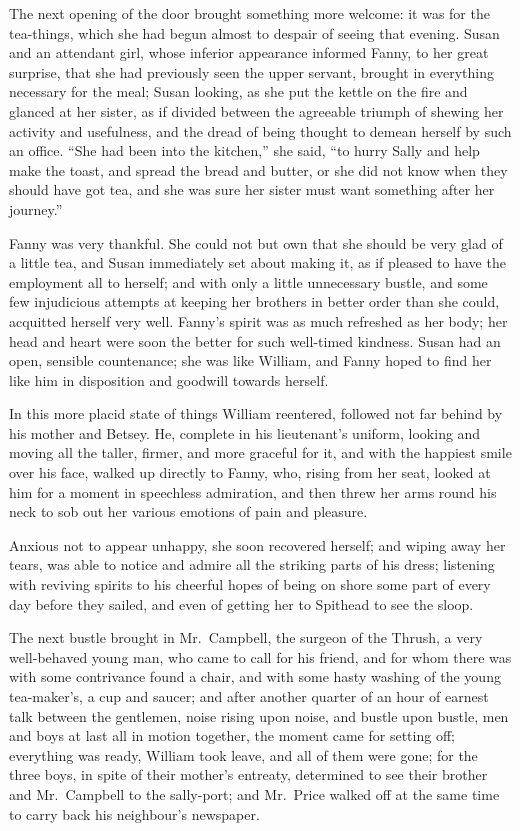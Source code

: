 The next opening of the door brought something more welcome:
it was for the tea-things, which she had begun almost
to despair of seeing that evening.  Susan and an
attendant girl, whose inferior appearance informed Fanny,
to her great surprise, that she had previously seen the
upper servant, brought in everything necessary for the meal;
Susan looking, as she put the kettle on the fire and glanced
at her sister, as if divided between the agreeable triumph
of shewing her activity and usefulness, and the dread
of being thought to demean herself by such an office.
``She had been into the kitchen,'' she said, ``to hurry Sally
and help make the toast, and spread the bread and butter,
or she did not know when they should have got tea,
and she was sure her sister must want something after
her journey.''

Fanny was very thankful.  She could not but own that she
should be very glad of a little tea, and Susan immediately
set about making it, as if pleased to have the employment
all to herself; and with only a little unnecessary bustle,
and some few injudicious attempts at keeping her brothers
in better order than she could, acquitted herself very well.
Fanny's spirit was as much refreshed as her body; her head
and heart were soon the better for such well-timed kindness.
Susan had an open, sensible countenance; she was like William,
and Fanny hoped to find her like him in disposition
and goodwill towards herself.

In this more placid state of things William reentered,
followed not far behind by his mother and Betsey.
He, complete in his lieutenant's uniform, looking and
moving all the taller, firmer, and more graceful for it,
and with the happiest smile over his face, walked up directly
to Fanny, who, rising from her seat, looked at him for a
moment in speechless admiration, and then threw her arms
round his neck to sob out her various emotions of pain and
pleasure.

Anxious not to appear unhappy, she soon recovered herself;
and wiping away her tears, was able to notice and admire
all the striking parts of his dress; listening with reviving
spirits to his cheerful hopes of being on shore some part
of every day before they sailed, and even of getting
her to Spithead to see the sloop.

The next bustle brought in Mr.\ Campbell, the surgeon
of the Thrush, a very well-behaved young man, who came
to call for his friend, and for whom there was with some
contrivance found a chair, and with some hasty washing of
the young tea-maker's, a cup and saucer; and after another
quarter of an hour of earnest talk between the gentlemen,
noise rising upon noise, and bustle upon bustle, men and
boys at last all in motion together, the moment came
for setting off; everything was ready, William took leave,
and all of them were gone; for the three boys, in spite
of their mother's entreaty, determined to see their brother
and Mr.\ Campbell to the sally-port; and Mr.\ Price walked
off at the same time to carry back his neighbour's newspaper.

